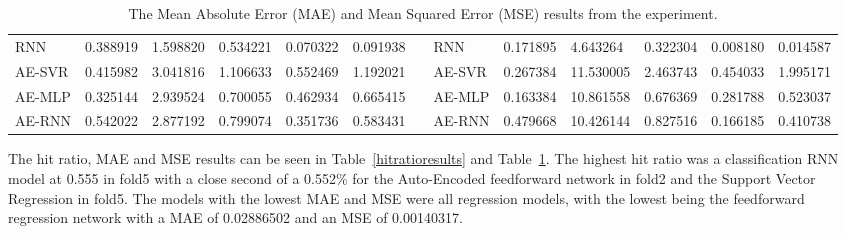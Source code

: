 \documentclass[11pt,a4paper]{article}
\numberwithin{equation}{section}
\begin{document}
\begin{table}[]
{\begin{tabular}{@{}lllllllllllll@{}}
\multicolumn{1}{|l|}{RNN}    & \multicolumn{1}{l|}{0.388919} & \multicolumn{1}{l|}{1.598820} & \multicolumn{1}{l|}{0.534221} & \multicolumn{1}{l|}{0.070322} & \multicolumn{1}{l|}{0.091938} & \multicolumn{1}{l|}{} & \multicolumn{1}{l|}{RNN}    & \multicolumn{1}{l|}{0.171895} & \multicolumn{1}{l|}{4.643264}  & \multicolumn{1}{l|}{0.322304} & \multicolumn{1}{l|}{0.008180} & \multicolumn{1}{l|}{0.014587} \\ \cmidrule(r){1-6} \cmidrule(l){8-13}
\multicolumn{1}{|l|}{AE-SVR} & \multicolumn{1}{l|}{0.415982} & \multicolumn{1}{l|}{3.041816} & \multicolumn{1}{l|}{1.106633} & \multicolumn{1}{l|}{0.552469} & \multicolumn{1}{l|}{1.192021} & \multicolumn{1}{l|}{} & \multicolumn{1}{l|}{AE-SVR} & \multicolumn{1}{l|}{0.267384} & \multicolumn{1}{l|}{11.530005} & \multicolumn{1}{l|}{2.463743} & \multicolumn{1}{l|}{0.454033} & \multicolumn{1}{l|}{1.995171} \\ \cmidrule(r){1-6} \cmidrule(l){8-13}
\multicolumn{1}{|l|}{AE-MLP} & \multicolumn{1}{l|}{0.325144} & \multicolumn{1}{l|}{2.939524} & \multicolumn{1}{l|}{0.700055} & \multicolumn{1}{l|}{0.462934} & \multicolumn{1}{l|}{0.665415} & \multicolumn{1}{l|}{} & \multicolumn{1}{l|}{AE-MLP} & \multicolumn{1}{l|}{0.163384} & \multicolumn{1}{l|}{10.861558} & \multicolumn{1}{l|}{0.676369} & \multicolumn{1}{l|}{0.281788} & \multicolumn{1}{l|}{0.523037} \\ \cmidrule(r){1-6} \cmidrule(l){8-13}
\multicolumn{1}{|l|}{AE-RNN} & \multicolumn{1}{l|}{0.542022} & \multicolumn{1}{l|}{2.877192} & \multicolumn{1}{l|}{0.799074} & \multicolumn{1}{l|}{0.351736} & \multicolumn{1}{l|}{0.583431} & \multicolumn{1}{l|}{} & \multicolumn{1}{l|}{AE-RNN} & \multicolumn{1}{l|}{0.479668} & \multicolumn{1}{l|}{10.426144} & \multicolumn{1}{l|}{0.827516} & \multicolumn{1}{l|}{0.166185} & \multicolumn{1}{l|}{0.410738} \\ \cmidrule(r){1-6} \cmidrule(l){8-13}
\end{tabular}%
}
\caption{The Mean Absolute Error (MAE) and Mean Squared Error (MSE) results from the experiment.}
\label{maemse}
\end{table}
The hit ratio, MAE and MSE results can be seen in Table~\ref{hitratioresults} and Table~\ref{maemse}. The highest hit ratio was a classification RNN model at 0.555 in fold5 with a close second of a 0.552\% for the Auto-Encoded feedforward network in fold2 and the Support Vector Regression in fold5. The models with the lowest MAE and MSE were all regression models, with the lowest being the feedforward regression network with a MAE of 0.02886502 and an MSE of 0.00140317.
\end{document}
